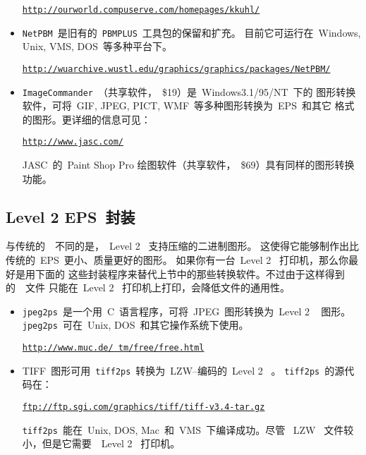 \begin{itemize}
	\href{http://ourworld.compuserve.com/homepages/kkuhl/}%
	{\texttt{http://ourworld.compuserve.com/homepages/kkuhl/}}
	
	\item \texttt{NetPBM}~是旧有的~\texttt{PBMPLUS}~工具包的保留和扩充。
	目前它可运行在~Windows, Unix, VMS, DOS~等多种平台下。
	
	\href{http://wuarchive.wustl.edu/graphics/graphics/packages/NetPBM/}%
	{\texttt{http://wuarchive.wustl.edu/graphics/graphics/packages/NetPBM/}}
	
	\item \texttt{ImageCommander}~（共享软件，~\$19）是~Windows3.1/95/NT~下的
	图形转换软件，可将~GIF, JPEG, PICT, WMF~等多种图形转换为~EPS~和其它
	格式的图形。更详细的信息可见：
	
	\href{http://www.jasc.com/}{\texttt{http://www.jasc.com/}}
	
	JASC~的~Paint Shop Pro 绘图软件（共享软件，~\$69）具有同样的图形转换
	功能。
\end{itemize}

\subsection[Level 2 EPS~封装]{Level 2 EPS~封装}\label{ssec:epswrapper}

与传统的~\PS~不同的是，~Level 2 \PS~支持压缩的二进制图形。
这使得它能够制作出比传统的~EPS~更小、质量更好的图形。
如果你有一台~Level 2 \PS~打印机，那么你最好是用下面的
这些封装程序来替代上节中的那些转换软件。不过由于这样得到的~\PS~文件
只能在~Level 2 \PS~打印机上打印，会降低文件的通用性。

\begin{itemize}
	\item \texttt{jpeg2ps}~是一个用~C~语言程序，可将~JPEG~图形转换为~Level 2 \PS~
	图形。\texttt{jpeg2ps}~可在~Unix, DOS~和其它操作系统下使用。
	
	\href{http://www.muc.de/~tm/free/free.html}{\texttt{http://www.muc.de/~tm/free/free.html}}
	
	\item TIFF~图形可用~\texttt{tiff2ps}~转换为~LZW--编码的~Level 2 \PS~。
	\texttt{tiff2ps}~的源代码在：
	
	\href{ftp://ftp.sgi.com/graphics/tiff/tiff-v3.4-tar.gz}%
	{\texttt{ftp://ftp.sgi.com/graphics/tiff/tiff-v3.4-tar.gz}}
	
	\texttt{tiff2ps}~能在~Unix, DOS, Mac~和~VMS~下编译成功。尽管
	~LZW \PS~文件较小，但是它需要~~Level 2 \PS~打印机。
\end{itemize}


